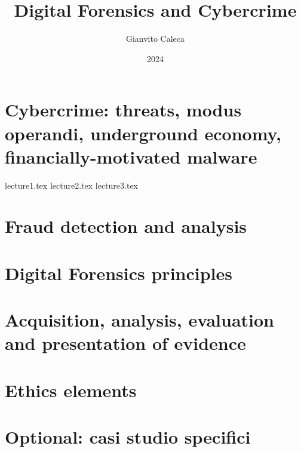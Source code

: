 \documentclass{report}
\title{Digital Forensics and Cybercrime}
\date{2024}
\author{Gianvito Caleca}
\begin{document}
\maketitle
\tableofcontents
\part{Cybercrime: threats, modus operandi, underground economy, financially-motivated malware}
{lecture1.tex}
{lecture2.tex}
{lecture3.tex}
\part{Fraud detection and analysis}
\part{Digital Forensics principles}
\part{Acquisition, analysis, evaluation and presentation of evidence}
\part{Ethics elements}
\part{Optional: casi studio specifici}
\end{document}
